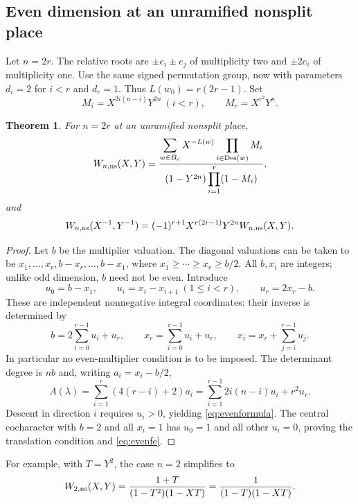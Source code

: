 \documentclass[11pt,a4paper]{article}
\newtheorem{theorem}{Theorem}
\theoremstyle{definition}
\newcommand{\Des}{\operatorname{Des}}
\begin{document}
\subsection{Even dimension at an unramified nonsplit place}
Let $n=2r$. The relative roots are $\pm e_i\pm e_j$ of multiplicity
two and $\pm2e_i$ of multiplicity one. Use the same signed
permutation group, now with parameters
$d_i=2$ for $i<r$ and $d_r=1$. Thus $L(w_0)=r(2r-1)$.
Set
\begin{equation}\label{eq:evenMi}
 M_i=X^{2i(n-i)}Y^{2n}\ (i<r),\qquad
 M_r=X^{r^2}Y^n.
\end{equation}
\begin{theorem}\label{thm:even}
For $n=2r$ at an unramified nonsplit place,
\begin{equation}\label{eq:evenformula}
 W_{n,\rm ns}(X,Y)=
 \frac{\displaystyle\sum_{w\in B_r}X^{-L(w)}
                         \prod_{i\in\Des(w)}M_i}
 {(1-Y^{2n})\displaystyle\prod_{i=1}^r(1-M_i)},
\end{equation}
and
\begin{equation}\label{eq:evenfe}
 W_{n,\rm ns}(X^{-1},Y^{-1})
 =(-1)^{r+1}X^{r(2r-1)}Y^{2n}W_{n,\rm ns}(X,Y).
\end{equation}
\end{theorem}
\begin{proof}
Let $b$ be the multiplier valuation. The diagonal valuations can be
taken to be $x_1,\ldots,x_r,b-x_r,\ldots,b-x_1$, where
$x_1\geq\cdots\geq x_r\geq b/2$. All $b,x_i$ are integers;
unlike odd dimension, $b$ need not be even. Introduce
\[
 u_0=b-x_1,\qquad u_i=x_i-x_{i+1}\ (1\leq i<r),\qquad
 u_r=2x_r-b.
\]
These are independent nonnegative integral coordinates: their inverse
is determined by
\[
 b=2\sum_{i=0}^{r-1}u_i+u_r,\qquad
 x_r=\sum_{i=0}^{r-1}u_i+u_r,\qquad
 x_i=x_r+\sum_{j=i}^{r-1}u_j.
\]
In particular no even-multiplier condition is to be imposed.
The determinant degree is $nb$ and, writing $a_i=x_i-b/2$,
\[
 A(\lambda)=\sum_{i=1}^r(4(r-i)+2)a_i
 =\sum_{i=1}^{r-1}2i(n-i)u_i+r^2u_r.
\]
Descent in direction $i$ requires $u_i>0$, yielding
\eqref{eq:evenformula}. The central cocharacter with $b=2$ and
all $x_i=1$ has $u_0=1$ and all other $u_i=0$, proving the
translation condition and \eqref{eq:evenfe}.
\end{proof}
For example, with $T=Y^2$, the case $n=2$ simplifies to
\[
 W_{2,\rm ns}(X,Y)=\frac{1+T}{(1-T^2)(1-XT)}
                 =\frac1{(1-T)(1-XT)}.
\]
\end{document}
